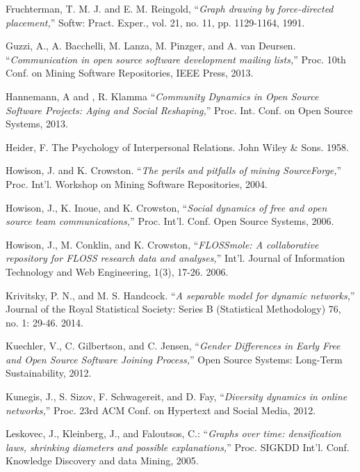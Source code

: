 \begin{thebibliography}{99.}
 Fruchterman, T. M. J. and E. M. Reingold, ``\textit{Graph drawing by force-directed placement,}'' Softw: Pract. Exper., vol. 21, no. 11, pp. 1129-1164, 1991.

 Guzzi, A., A. Bacchelli, M. Lanza, M. Pinzger, and A. van Deursen. ``\textit{Communication in open source software development mailing lists,}'' Proc. 10th Conf. on Mining Software Repositories, IEEE Press, 2013.

 Hannemann, A and , R. Klamma ``\textit{Community Dynamics in Open Source Software Projects: Aging and Social Reshaping,}'' Proc. Int. Conf. on Open Source Systems, 2013. 

 Heider, F. The Psychology of Interpersonal Relations. John Wiley \& Sons. 1958.

 Howison, J. and K. Crowston. ``\textit{The perils and pitfalls of mining SourceForge,}'' Proc. Int'l. Workshop on Mining Software Repositories, 2004.  

 Howison, J., K. Inoue, and K. Crowston, ``\textit{Social dynamics of free and open source team communications,}'' Proc. Int'l. Conf. Open Source Systems, 2006.  

 Howison, J., M. Conklin, and K. Crowston, ``\textit{FLOSSmole: A collaborative repository for FLOSS research data and analyses,}'' Int'l. Journal of Information Technology and Web Engineering, 1(3), 17-26. 2006.

 Krivitsky, P. N., and M. S. Handcock. ``\textit{A separable model for dynamic networks,}'' Journal of the Royal Statistical Society: Series B (Statistical Methodology) 76, no. 1: 29-46. 2014.

 Kuechler, V., C. Gilbertson, and C. Jensen, ``\textit{Gender Differences in Early Free and Open Source Software Joining Process,}'' Open Source Systems: Long-Term Sustainability, 2012. 

 Kunegis, J., S. Sizov, F. Schwagereit, and D. Fay, ``\textit{Diversity dynamics in online networks,}'' Proc. 23rd ACM Conf. on Hypertext and Social Media, 2012. 

 Leskovec, J., Kleinberg, J., and Faloutsos, C.: ``\textit{Graphs over time: densification laws, shrinking diameters and possible explanations,}'' Proc. SIGKDD Int'l. Conf. Knowledge Discovery and data Mining, 2005. 


\end{thebibliography}
